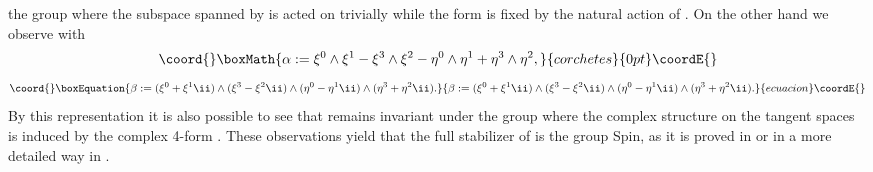 \documentclass[a4paper,12pt,draft]{article}
\begin{document}
the group \coordHE{} where the subspace
spanned by \coordHE{} is acted on trivially while the form \myHighlight{$\zeta$}\coordHE{} is fixed
by the natural action of \coordHE{}. 
On the other hand we observe \coordHE{} with
\[\coord{}\boxMath{\alpha :=\xi^0\wedge\xi^1-\xi^3\wedge\xi^2-\eta^0\wedge\eta^1
+\eta^3\wedge\eta^2,}{corchetes}{0pt}\coordE{}\]
\begin{equation}\coord{}\boxEquation{
\beta :=(\xi^0+\xi^1\ii )\wedge
(\xi^3-\xi^2\ii )\wedge (\eta^0-\eta^1\ii )\wedge (\eta^3+\eta^2\ii ).
\label{komplex}
}{
\beta :=(\xi^0+\xi^1\ii )\wedge
(\xi^3-\xi^2\ii )\wedge (\eta^0-\eta^1\ii )\wedge (\eta^3+\eta^2\ii ).
}{ecuacion}\coordE{}\end{equation}
By this representation it is also possible to see that
\coordHE{} remains invariant under the group
\coordHE{} where 
the complex structure on the tangent spaces is induced by 
the complex 4-form \myHighlight{$\beta$}\coordHE{}. These observations yield that the full
stabilizer of \coordHE{} is the
group Spin\coordHE{}, as it is proved in \cite{bry-sal} or
in a more detailed way in \cite{bry}. 
\end{document}
